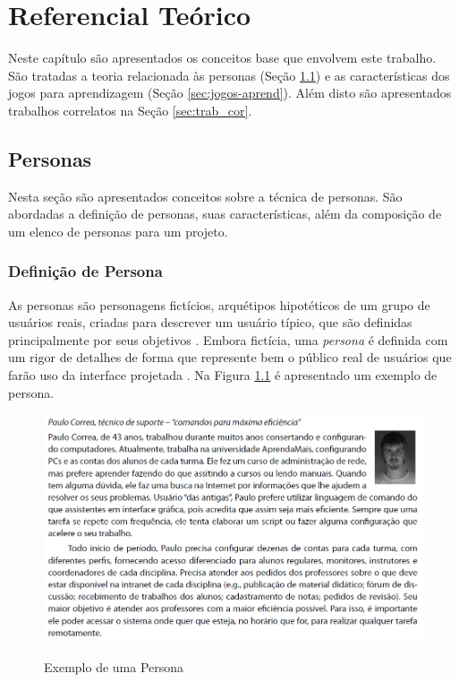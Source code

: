 \chapter{Referencial Teórico}
\label{chap:ref}


Neste capítulo são apresentados os conceitos base que envolvem este trabalho. São tratadas a teoria relacionada às personas (Seção \ref{sec:personas}) e as características dos jogos para aprendizagem (Seção \ref{sec:jogos-aprend}). Além disto são apresentados trabalhos correlatos na Seção \ref{sec:trab_cor}. 

\section{Personas}
\label{sec:personas}

Nesta seção são apresentados conceitos sobre a técnica de personas. São abordadas a definição de personas, suas características, além da composição de um elenco de personas para um projeto.

\subsection{Definição de Persona}
\label{sub:def-pers}
As personas são personagens fictícios, arquétipos hipotéticos de um grupo de usuários reais, criadas para descrever um usuário típico, que são definidas principalmente por seus objetivos \cite{cooper07, pruitt, cooper99}. Embora fictícia, uma \textit{persona} é definida com um rigor de detalhes de forma que represente bem o público real de usuários que farão uso da interface projetada \cite[p. 154]{BarbosaEtAl2021}. Na Figura \ref{Fig:ex-persona.png} é apresentado um exemplo de persona.

\begin{figure}[htbp]
	\centering
	\caption{Exemplo de uma Persona}
	\includegraphics[keepaspectratio=true,scale=0.6]{figuras/metodologia/exemplo-persona.png}
	\label{Fig:ex-persona.png}
\end{figure}

